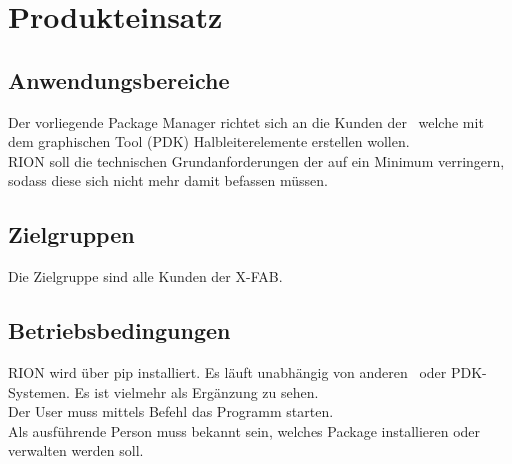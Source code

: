 \chapter{Produkteinsatz}

\section{Anwendungsbereiche}
Der vorliegende Package Manager richtet sich an die Kunden der \x~welche mit dem graphischen Tool (PDK) Halbleiterelemente erstellen wollen. \\
RION soll die technischen Grundanforderungen der  auf ein Minimum verringern, sodass diese sich nicht mehr damit befassen müssen.

\section{Zielgruppen}
Die Zielgruppe sind alle Kunden der X-FAB.


\section{Betriebsbedingungen}
RION wird über pip installiert. Es läuft unabhängig von anderen \x~oder PDK-Systemen. Es ist vielmehr als Ergänzung zu sehen.\\
Der User muss mittels Befehl das Programm starten.\\
Als ausführende Person muss bekannt sein, welches Package installieren oder verwalten werden soll.